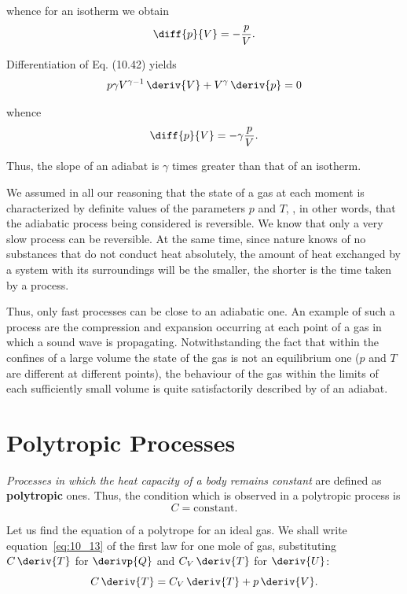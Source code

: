 \noindent
whence for an isotherm we obtain
\begin{equation}\label{eq:10_43}
	\diff{p}{V} = -\frac{p}{V}.
\end{equation}

\noindent
Differentiation of Eq. (10.42) yields
\begin{equation*}
	p \gamma V^{\gamma - 1}\,\deriv{V} + V^{\gamma}\,\deriv{p} = 0
\end{equation*}

\noindent
whence
\begin{equation*}
	\diff{p}{V} = -\gamma \frac{p}{V}.
\end{equation*}

\noindent
Thus, the slope of an adiabat is $\gamma$ times greater than that of an isotherm.

We assumed in all our reasoning that the state of a gas at each moment is characterized by definite values of the parameters $p$ and $T$, \ie, in other words, that the adiabatic process being considered is reversible. We know that only a very slow process can be reversible. At the same time, since nature knows of no substances that do not conduct heat absolutely, the amount of heat exchanged by a system with its surroundings will be the smaller, the shorter is the time taken by a process.

Thus, only fast processes can be close to an adiabatic one. An example of such a process are the compression and expansion occurring at each point of a gas in which a sound wave is propagating. Notwithstanding the fact that within the confines of a large volume the state of the gas is not an equilibrium one ($p$ and $T$ are different at different points), the behaviour of the gas within the limits of each sufficiently small volume is quite satisfactorily described by  of an adiabat.

\section{Polytropic Processes}\label{sec:10_11}

\textit{Processes in which the heat capacity of a body remains constant} are defined as \textbf{polytropic} ones. Thus, the condition which is observed in a polytropic process is
\begin{equation}\label{eq:10_44}
	C = \text{constant}.
\end{equation}

Let us find the equation of a polytrope for an ideal gas. We shall write equation~\eqref{eq:10_13} of the first law for one mole of gas, substituting $C\,\deriv{T}$ for $\derivp{Q}$ and $C_V\,\deriv{T}$ for $\deriv{U}$:
\begin{equation}\label{eq:10_45}
	C\,\deriv{T} = C_V\,\deriv{T} + p\,\deriv{V}.
\end{equation}

